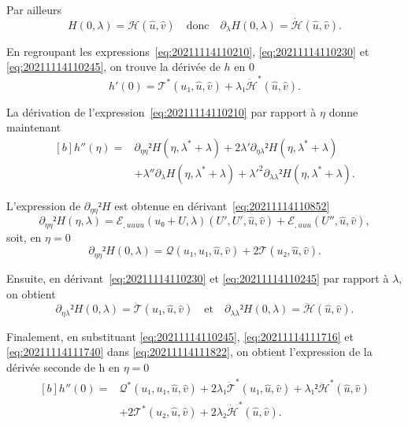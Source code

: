 \documentclass[12pt, final]{amsart}
\begin{document}
Par ailleurs
\begin{equation}
  \label{eq:20211114110245}
  H(0, λ)=ℋ(\hat{u}, \hat{v})\quad\text{donc}\quad∂_λ H(0, λ)=\dot{ℋ}(\hat{u}, \hat{v}).
\end{equation}

En regroupant les expressions~\eqref{eq:20211114110210},
\eqref{eq:20211114110230} et \eqref{eq:20211114110245}, on trouve la dérivée de
\(h\) en 0
\begin{equation}
  h'(0)=𝒯^*(u₁, \hat{u}, \hat{v})+λ₁\dot{ℋ}^*(\hat{u}, \hat{v}).
\end{equation}

La dérivation de l'expression~\eqref{eq:20211114110210} par rapport à \(η\)
donne maintenant
\begin{equation}
  \label{eq:20211114111822}
  \begin{aligned}[b]
    h''(η)={}&∂_{ηη}² H(η, λ^*+λ)+2λ'∂_{ηλ}² H(η, λ^*+λ)\\
    &+λ''∂_{λ}H(η, λ^*+λ)+λ'^2∂_{λλ}²H(η, λ^*+λ).
  \end{aligned}
\end{equation}

L'expression de \(∂_{ηη}²H\) est obtenue en
dérivant~\eqref{eq:20211114110852}
\begin{equation}
  ∂_{ηη}²H(η, λ)=ℰ_{,uuuu}(u₀+U, λ)(U', U', \hat{u}, \hat{v})
  +ℰ_{,uuu}(U'', \hat{u}, \hat{v}),
\end{equation}
soit, en \(η=0\)
\begin{equation}
  \label{eq:20211114111716}
  ∂_{ηη}²H(0, λ)=𝒬(u₁, u₁, \hat{u}, \hat{v})+2𝒯(u₂, \hat{u}, \hat{v}).
\end{equation}

Ensuite, en dérivant~\eqref{eq:20211114110230} et \eqref{eq:20211114110245} par
rapport à \(λ\), on obtient
\begin{equation}
  \label{eq:20211114111740}
  ∂_{ηλ}²H(0, λ)=\dot{𝒯}(u₁, \hat{u}, \hat{v})
  \quad\text{et}\quad
  ∂_{λλ}²H(0, λ)=\ddot{ℋ}(\hat{u}, \hat{v}).
\end{equation}

Finalement, en substituant \eqref{eq:20211114110245}, \eqref{eq:20211114111716}
et \eqref{eq:20211114111740} dans \eqref{eq:20211114111822}, on obtient
l'expression de la dérivée seconde de h en \(η=0\)
\begin{equation}
  \begin{aligned}[b]
    h''(0)={}&𝒬^*(u₁, u₁, \hat{u}, \hat{v})+2λ₁\dot{𝒯}^*(u₁, \hat{u}, \hat{v})
    +λ₁²\ddot{ℋ}^*(\hat{u}, \hat{v})\\
    &+2𝒯^*(u₂, \hat{u}, \hat{v})+2λ₂\dot{ℋ}^*(\hat{u}, \hat{v}).
  \end{aligned}
\end{equation}
\end{document}
